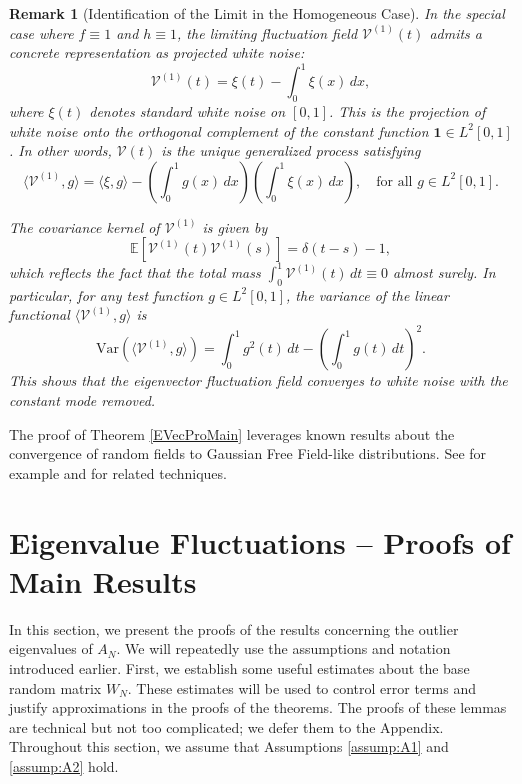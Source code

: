 \documentclass[11pt, reqno]{amsart}
\numberwithin{equation}{section}
\newtheorem{remark}{Remark}[section]
\begin{document}
\begin{remark}[Identification of the Limit in the Homogeneous Case]
In the special case where \( f \equiv 1 \) and \( h \equiv 1 \), the limiting fluctuation field \( \mathcal{V}^{(1)}(t) \) admits a concrete representation as projected white noise:
\[
\mathcal{V}^{(1)}(t) = \xi(t) - \int_0^1 \xi(x)\,dx,
\]
where \( \xi(t) \) denotes standard white noise on \( [0,1] \). This is the projection of white noise onto the orthogonal complement of the constant function \( \mathbf{1} \in L^2[0,1] \). In other words, \( \mathcal{V}(t) \) is the unique generalized process satisfying
\[
\langle \mathcal{V}^{(1)}, g \rangle = \langle \xi, g \rangle - \left( \int_0^1 g(x)\,dx \right) \left( \int_0^1 \xi(x)\,dx \right), \quad \text{for all } g \in L^2[0,1].
\]

The covariance kernel of \( \mathcal{V}^{(1)} \) is given by
\[
\mathbb{E}[\mathcal{V}^{(1)}(t)\mathcal{V}^{(1)}(s)] = \delta(t-s) - 1,
\]
which reflects the fact that the total mass \( \int_0^1 \mathcal{V}^{(1)}(t)\,dt \equiv 0 \) almost surely. In particular, for any test function \( g \in L^2[0,1] \), the variance of the linear functional \( \langle \mathcal{V}^{(1)}, g \rangle \) is
\[
\mathrm{Var}(\langle \mathcal{V}^{(1)}, g \rangle) = \int_0^1 g^2(t)\,dt - \left( \int_0^1 g(t)\,dt \right)^2.
\]
 This shows that the eigenvector fluctuation field converges to white noise with the constant mode removed.
\end{remark}


The proof of Theorem \ref{EVecProMain} leverages known results about the convergence of random fields to Gaussian Free Field-like distributions. See for example \cite{camia2015planar} and \cite{sheffield2007gaussian} for related techniques.


\section{Eigenvalue Fluctuations – Proofs of Main Results}\label{section:eigenvalue fluctuations}

In this section, we present the proofs of the results concerning the outlier eigenvalues of $A_N$. We will repeatedly use the assumptions and notation introduced earlier. First, we establish some useful estimates about the base random matrix $W_N$. These estimates will be used to control error terms and justify approximations in the proofs of the theorems. The proofs of these lemmas are technical but not too complicated; we defer them to the Appendix. Throughout this section, we assume that Assumptions \ref{assump:A1} and \ref{assump:A2} hold. 
\end{document}
